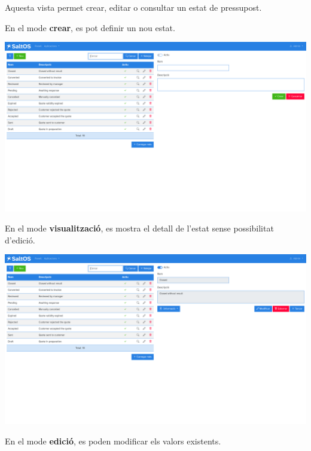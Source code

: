 \documentclass[a4paper]{article}
\begin{document}
Aquesta vista permet crear, editar o consultar un estat de pressupost.

En el mode \textbf{crear}, es pot definir un nou estat.

\begin{center}\includegraphics[width=1\textwidth]{../ujest/snaps/test-screenshots-js-screenshots-crm-quotes-status-create-ca-es-1-snap.png}\end{center}

En el mode \textbf{visualització}, es mostra el detall de l'estat sense possibilitat d'edició.

\begin{center}\includegraphics[width=1\textwidth]{../ujest/snaps/test-screenshots-js-screenshots-crm-quotes-status-view-10-ca-es-1-snap.png}\end{center}

En el mode \textbf{edició}, es poden modificar els valors existents.
\end{document}

